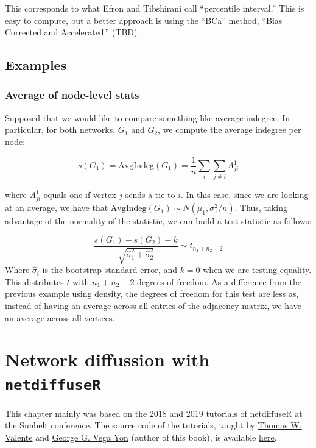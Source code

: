\documentclass[
]{book}
\begin{document}
This corresponds to what Efron and Tibshirani call ``percentile interval.''
This is easy to compute, but a better approach is using the ``BCa'' method,
``Bias Corrected and Accelerated.'' (TBD)

\hypertarget{examples}{%
\section{Examples}\label{examples}}

\hypertarget{average-of-node-level-stats}{%
\subsection{Average of node-level stats}\label{average-of-node-level-stats}}

Supposed that we would like to compare something like average indegree.
In particular, for both networks, \(G_1\) and \(G_2\), we compute the average
indegree per node:

\[
s(G_1) = \mbox{AvgIndeg}(G_1) = \frac{1}{n}\sum_{i}\sum_{j\neq i}A^1_{ji}
\]

\noindent where \(A^1_{ji}\) equals one if vertex \(j\) sends a tie to \(i\). In this
case, since we are looking at an average, we have that
\(\mbox{AvgIndeg}(G_1) \sim N(\mu_1, \sigma^2_1/n)\). Thus, taking advantage of
the normality of the statistic, we can build a test statistic as follows:

\[
\frac{s(G_1) - s(G_2) - k}{\sqrt{\hat\sigma_{1}^2 + \hat\sigma_{2}^2}} \sim t_{n_1 + n_2 - 2}
\]
Where \(\hat\sigma_i\) is the bootstrap standard error, and \(k = 0\) when we are testing
equality. This distributes \(t\) with
\(n_1+n_2-2\) degrees of freedom. As a difference from the previous example using
density, the degrees of freedom for this test are less as, instead of having an
average across all entries of the adjacency matrix, we have an average across all
vertices.

\hypertarget{network-diffussion-with-netdiffuser}{%
\chapter{\texorpdfstring{Network diffussion with \texttt{netdiffuseR}}{Network diffussion with netdiffuseR}}\label{network-diffussion-with-netdiffuser}}

This chapter mainly was based on the 2018 and 2019 tutorials of netdiffuseR
at the Sunbelt conference. The source code of the tutorials, taught by \href{https://keck.usc.edu/faculty-search/thomas-william-valente/}{Thomas W. Valente}
and \href{https://ggvy.cl}{George G. Vega Yon} (author of this book), is available \href{https://github.com/USCCANA/netdiffuser-sunbelt2018/tree/sunbelt2019}{here}.
\end{document}
